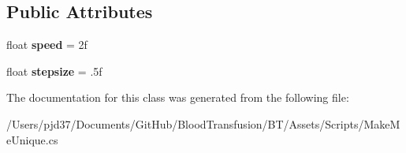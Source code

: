 \subsection*{Public Attributes}
\begin{DoxyCompactItemize}
\item 
float {\bfseries speed} = 2f\hypertarget{class_make_me_unique_a61f0fbbd728408bd412274f4cba982d9}{}\label{class_make_me_unique_a61f0fbbd728408bd412274f4cba982d9}

\item 
float {\bfseries stepsize} = .\+5f\hypertarget{class_make_me_unique_addd19eef82105fc9f2ae6fcea3469e4d}{}\label{class_make_me_unique_addd19eef82105fc9f2ae6fcea3469e4d}

\end{DoxyCompactItemize}


The documentation for this class was generated from the following file\+:\begin{DoxyCompactItemize}
\item 
/\+Users/pjd37/\+Documents/\+Git\+Hub/\+Blood\+Transfusion/\+B\+T/\+Assets/\+Scripts/Make\+Me\+Unique.\+cs\end{DoxyCompactItemize}
